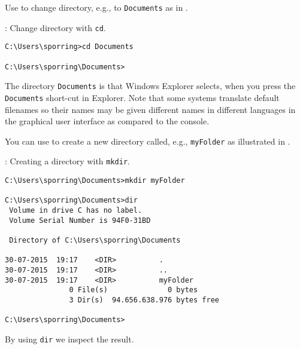 Use  to change directory, e.g.,  to \lstinline[language=console]{Documents} as in .
\begin{codeNOutput}[label=windowsCD]{: Change directory with \lstinline[language=console]{cd}.}
  \begin{lstlisting}[language=console,escapechar=§]
C:\Users\sporring>cd Documents

C:\Users\sporring\Documents>
\end{lstlisting}
\end{codeNOutput}
The directory \lstinline[language=console]{Documents} is that Windows Explorer selects, when you press the \lstinline[language=console]{Documents} short-cut in Explorer.  Note that some systems translate default filenames so their names may be given different names in different languages in the graphical user interface as compared to the console. 




You can use  to create a new directory called, e.g., \lstinline[language=console]{myFolder} as illustrated in .
\begin{codeNOutput}[label=windowsMkdir]{: Creating a directory with \lstinline[language=console]{mkdir}.}
  \begin{lstlisting}[language=console,escapechar=§]
C:\Users\sporring\Documents>mkdir myFolder

C:\Users\sporring\Documents>dir
 Volume in drive C has no label.
 Volume Serial Number is 94F0-31BD

 Directory of C:\Users\sporring\Documents

30-07-2015  19:17    <DIR>          .
30-07-2015  19:17    <DIR>          ..
30-07-2015  19:17    <DIR>          myFolder
               0 File(s)              0 bytes
               3 Dir(s)  94.656.638.976 bytes free

C:\Users\sporring\Documents>
\end{lstlisting}
\end{codeNOutput}
By using \lstinline[language=console]{dir} we inspect the result.


